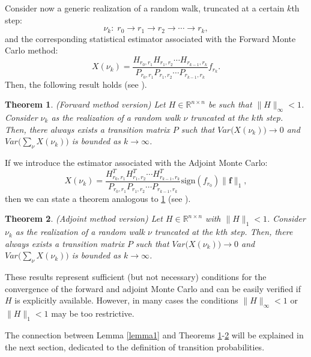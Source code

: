 \documentclass[final,leqno,onefignum,onetabnum]{siamltex1213}
\newtheorem{thm}{Theorem}
\begin{document}
Consider now a generic realization of a random walk, truncated at a certain $k$th step:
\[
 \nu_k:\; r_0\rightarrow r_1 \rightarrow r_2 \rightarrow \cdots \rightarrow r_k,
\]
and the corresponding statistical estimator associated with the Forward Monte
Carlo method:
\[
 X(\nu_k)=\frac{H_{r_0,r_1}H_{r_1,r_2}\cdots
H_{r_{k-1},r_k}}{P_{r_0,r_1}P_{r_1,r_2}\cdots P_{r_{k-1},r_k}}f_{r_k}.
\]
Then, the following result holds (see \cite{MASC2013}).
\begin{thm}\textit{(Forward method version)}
Let $H\in \mathbb{R}^{n\times n}$ be such that $\lVert H\rVert_{\infty}<1$.
Consider $\nu_k$ as the realization of a random walk $\nu$ truncated at the
$k$th step. Then,
there always exists a
transition matrix $P$ such that
$Var\Big(X(\nu_k)\Big)\rightarrow 0$ and
$Var\Big(\sum_{\nu}X(\nu_k)\Big)$ is bounded as $k\rightarrow \infty$.
\label{for_thm}
\end{thm}

If we introduce the estimator associated with the Adjoint Monte Carlo:
\[
 X(\nu_k)=\frac{H^T_{r_0,r_1}H^T_{r_1,r_2}\cdots
H^T_{r_{k-1},r_k}}{P_{r_0,r_1}P_{r_1,r_2}\cdots
P_{r_{k-1},r_k}}\text{sign}(f_{r_0})\lVert \mathbf{f}\rVert_1,
\]
then we can state a
theorem analogous to \ref{for_thm} (see \cite{MASC2013}).

\begin{thm}\textit{(Adjoint method version)}
 Let $H\in \mathbb{R}^{n\times n}$ with $\lVert H\rVert_{1}<1$.
Consider $\nu_k$ as the realization of a random walk $\nu$ truncated at the
$k$th step. Then,
there always exists a
transition matrix $P$ such that
$Var\Big(X(\nu_k)\Big)\rightarrow 0$ and
$Var\Big(\sum_{\nu}X(\nu_k)\Big)$ is bounded as $k\rightarrow \infty$.
\label{adj_thm}
\end{thm}

These results represent sufficient (but not necessary) conditions
for the convergence
of the forward and adjoint Monte Carlo and can be easily verified if $H$ is explicitly
available.
However, in many cases the conditions $\lVert H\rVert_{\infty}<1$ or
$\lVert H\rVert_1<1$ may be too restrictive.

The connection between Lemma \ref{lemma1} and Theorems \ref{for_thm}-\ref{adj_thm}
will be explained in
the next section, dedicated to the definition of transition probabilities.
\end{document}
